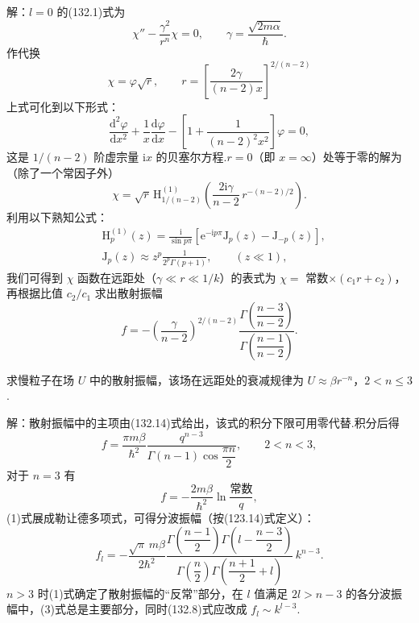 \begin{xiti}
解：$l=0$ 的(132.1)式为
\begin{equation*}
  \chi''-\frac{\gamma^2}{r^n}\chi=0,\qquad
  \gamma=\frac{\sqrt{2m\alpha}}{\hbar}.
\end{equation*}
作代换
\begin{equation*}
  \chi=\varphi\sqrt{r},\qquad
  r=\left[\frac{2\gamma}{(n-2)x}\right]^{2/(n-2)}
\end{equation*}
上式可化到以下形式：
\begin{equation*}
  \frac{\mathrm{d}^2\varphi}{\mathrm{d}x^2}
  +\frac{1}{x}\frac{\mathrm{d}\varphi}{\mathrm{d}x}
  -\left[1+\frac{1}{(n-2)^2x^2}\right]\varphi=0,
\end{equation*}
这是 $1/(n-2)$ 阶虚宗量 $\mathrm{i}x$ 的贝塞尔方程.$r=0$（即 $x=\infty$）处等于零的解为（除了一个常因子外）
\begin{equation*}
  \chi=\sqrt{r}\,\mathrm{H}^{(1)}_{1/(n-2)}
  \left(\frac{2\mathrm{i}\gamma}{n-2}\,r^{-(n-2)/2}\right).
\end{equation*}
利用以下熟知公式：
\begin{equation*}
\begin{aligned}
  &\mathrm{H}^{(1)}_{p}(z)
  =\frac{\mathrm{i}}{\sin p\pi}
  \left[\mathrm{e}^{-\mathrm{i}p\pi}\mathrm{J}_{p}(z)
  -\mathrm{J}_{-p}(z)\right],\\
  &\mathrm{J}_{p}(z)\approx z^{p}\frac{1}{2^{p}\Gamma(p+1)},
  \qquad(z\ll1),
\end{aligned}
\end{equation*}
我们可得到 $\chi$ 函数在远距处（$\gamma\ll r\ll1/k$）的表式为
$\chi=$ 常数$\times(c_1r+c_2)$，再根据比值 $c_2/c_1$ 求出散射振幅
\begin{equation*}
  f=-\left(\frac{\gamma}{n-2}\right)^{2/(n-2)}
  \frac{\Gamma\left(\dfrac{n-3}{n-2}\right)}
  {\Gamma\left(\dfrac{n-1}{n-2}\right)}.
\end{equation*}

\quad 求慢粒子在场 $U$ 中的散射振幅，该场在远距处的衰减规律为 $U\approx\beta r^{-n}$，$2<n\leqslant3$.

解：散射振幅中的主项由(132.14)式给出，该式的积分下限可用零代替.积分后得
\setcounter{equation}{0}\renewcommand{\theequation}{\arabic{equation}}%
\begin{equation}
  f=\frac{\pi m\beta}{\hbar^2}
  \frac{q^{n-3}}{\Gamma(n-1)\cos\dfrac{\pi n}{2}},
  \qquad 2<n<3,
\end{equation}
对于 $n=3$ 有
\begin{equation}
  f=-\frac{2m\beta}{\hbar^2}\ln\frac{\text{常数}}{q},
\end{equation}
(1)式展成勒让德多项式，可得分波振幅（按(123.14)式定义）：
\begin{equation}
  f_l=-\frac{\sqrt{\pi}\,m\beta}{2\hbar^2}
  \frac{\Gamma\left(\dfrac{n-1}{2}\right)
  \Gamma\left(l-\dfrac{n-3}{2}\right)}
  {\Gamma\left(\dfrac{n}{2}\right)
  \Gamma\left(\dfrac{n+1}{2}+l\right)}\,k^{n-3}.
\end{equation}
$n>3$ 时(1)式确定了散射振幅的“反常”部分，在 $l$ 值满足 $2l>n-3$ 的各分波振幅中，(3)式总是主要部分，同时(132.8)式应改成 $f_l\sim k^{l-3}$.


\end{xiti}
